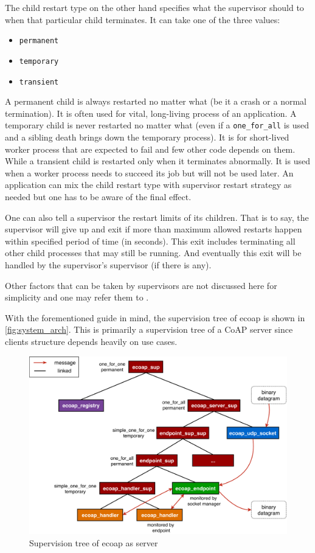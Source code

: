 The child restart type on the other hand specifies what the supervisor should to when that particular child terminates. It can take one of the three values:

\begin{itemize}

\item \verb|permanent|
\item \verb|temporary|
\item \verb|transient|

\end{itemize}

A permanent child is always restarted no matter what (be it a crash or a normal termination). It is often used for vital, long-living process of an application. A temporary child is never restarted no matter what (even if a \verb|one_for_all| is used and a sibling death brings down the temporary process). It is for short-lived worker process that are expected to fail and few other code depends on them. While a transient child is restarted only when it terminates abnormally. It is used when a worker process needs to succeed its job but will not be used later. An application can mix the child restart type with supervisor restart strategy as needed but one has to be aware of the final effect. 

One can also tell a supervisor the restart limits of its children. That is to say, the supervisor will give up and exit if more than maximum allowed restarts happen within specified period of time (in seconds). This exit includes terminating all other child processes that may still be running. And eventually this exit will be handled by the supervisor's supervisor (if there is any).

Other factors that can be taken by supervisors are not discussed here for simplicity and one may refer them to \autocite{otp_supervisor}.

With the forementioned guide in mind, the supervision tree of ecoap is shown in \autoref{fig:system_arch}. This is primarily a supervision tree of a CoAP server since clients structure depends heavily on use cases. 

\begin{figure}[!htbp]
\centering
\includegraphics[scale = 0.55]{system_arch_vertical}
\caption{Supervision tree of ecoap as server}
\label{fig:system_arch}
\end{figure}

